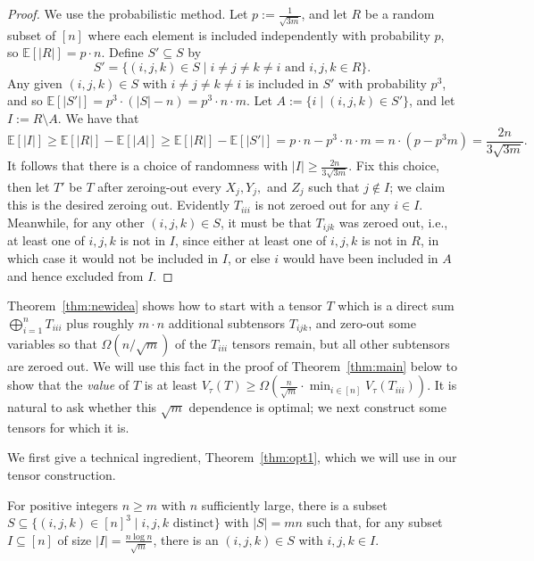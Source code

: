 \documentclass{theoretics}
\newcommand{\E}{\mathbb{E}}
\begin{document}
\begin{proof}
We use the probabilistic method. Let $p := \frac{1}{\sqrt{3m}}$, and let $R$ be a random subset of $[n]$ where each element is included independently with probability $p$, so $\E[|R|] = p \cdot n$. Define $S' \subseteq S$ by $$S' = \{ (i,j,k) \in S \mid i\neq j \neq k \neq i \text{ and } i,j,k \in R\}.$$ Any given $(i,j,k) \in S$ with $i\neq j \neq k \neq i$ is included in $S'$ with probability $p^3$, and so $\E[|S'|] = p^3 \cdot (|S|-n) = p^3 \cdot n \cdot m$. Let $A := \{ i \mid (i,j,k) \in S'\}$, and let $I := R \setminus A$. We have that
$$\E[|I|] \geq \E[|R|] - \E[|A|] \geq \E[|R|] - \E[|S'|] = p \cdot n - p^3 \cdot n \cdot m = n\cdot (p - p^3 m) = \frac{2n}{3 \sqrt{3m}}.$$
It follows that there is a choice of randomness with $|I| \geq \frac{2n}{3 \sqrt{3m}}$. Fix this choice, then let $T'$ be $T$ after zeroing-out every $X_j,Y_j,$ and $Z_j$ such that $j \notin I$; we claim this is the desired zeroing out. Evidently $T_{iii}$ is not zeroed out for any $i\in I$. Meanwhile, for any other $(i,j,k) \in S$, it must be that $T_{ijk}$ was zeroed out, i.e., at least one of $i,j,k$ is not in $I$, since either at least one of $i,j,k$ is not in $R$, in which case it would not be included in $I$, or else $i$ would have been included in $A$ and hence excluded from $I$.
\end{proof}

Theorem~\ref{thm:newidea} shows how to start with a tensor $T$ which is a direct sum $\bigoplus_{i=1}^n T_{iii}$ plus roughly $m \cdot n$ additional subtensors $T_{ijk}$, and zero-out some variables so that $\Omega(n / \sqrt{m})$ of the $T_{iii}$ tensors remain, but all other subtensors are zeroed out. We will use this fact in the proof of Theorem~\ref{thm:main} below to show that the \emph{value} of $T$ is at least $V_\tau(T) \geq \Omega\left(\frac{n}{\sqrt{m}} \cdot \min_{i \in [n]} V_\tau(T_{iii})\right)$. It is natural to ask whether this $\sqrt{m}$ dependence is optimal; we next construct some tensors for which it is.

We first give a technical ingredient, Theorem~\ref{thm:opt1}, which we will use in our tensor construction.

\begin{theorem} \label{thm:opt1}
For positive integers $n \geq m$ with $n$ sufficiently large, there is a subset $S \subseteq \{ (i,j,k) \in [n]^3 \mid i,j,k \text{ distinct}\}$ with $|S|=mn$ such that, for any subset $I \subseteq [n]$ of size $|I| = \frac{n \log n}{\sqrt{m}}$, there is an $(i,j,k) \in S$ with $i,j,k \in I$. 
\end{theorem}
\end{document}
